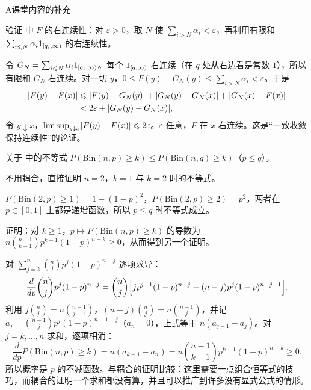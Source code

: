 \begin{exercises}{A}{课堂内容的补充}
\item\label{ex:distributions:A9} 验证 中 $F$ 的右连续性：对 $\varepsilon>0$，取 $N$ 使 $\sum_{i>N}\alpha_i<\varepsilon$，再利用有限和 $\sum_{i\leqslant N}\alpha_i1_{[q_i,\infty)}$ 的右连续性。
\begin{solution}
令 $G_N=\sum_{i\leqslant N}\alpha_i1_{[q_i,\infty)}$。每个 $1_{[q,\infty)}$ 右连续（在 $q$ 处从右边看是常数 $1$），所以有限和 $G_N$ 右连续。对一切 $y$，$0\leqslant F(y)-G_N(y)\leqslant\sum_{i>N}\alpha_i<\varepsilon$。于是
\[
\begin{aligned}
\lvert F(y)-F(x)\rvert&\leqslant\lvert F(y)-G_N(y)\rvert+\lvert G_N(y)-G_N(x)\rvert+\lvert G_N(x)-F(x)\rvert\\
&<2\varepsilon+\lvert G_N(y)-G_N(x)\rvert,
\end{aligned}
\]
令 $y\downarrow x$，$\limsup_{y\downarrow x}\lvert F(y)-F(x)\rvert\leqslant2\varepsilon$。$\varepsilon$ 任意，$F$ 在 $x$ 右连续。这是“一致收敛保持连续性”的论证。
\end{solution}

\item\label{ex:distributions:A10} 关于 中的不等式 $P(\mathrm{Bin}(n,p)\geqslant k)\leqslant P(\mathrm{Bin}(n,q)\geqslant k)$（$p\leqslant q$）。
\begin{questions}
\item 不用耦合，直接证明 $n=2$，$k=1$ 与 $k=2$ 时的不等式。
\begin{solution}
$P(\mathrm{Bin}(2,p)\geqslant1)=1-(1-p)^2$，$P(\mathrm{Bin}(2,p)\geqslant2)=p^2$，两者在 $p\in[0,1]$ 上都是递增函数，所以 $p\leqslant q$ 时不等式成立。
\end{solution}
\item 证明：对 $k\geqslant1$，$p\mapsto P(\mathrm{Bin}(n,p)\geqslant k)$ 的导数为 $n\binom{n-1}{k-1}p^{k-1}(1-p)^{n-k}\geqslant0$，从而得到另一个证明。
\begin{solution}
对 $\sum_{j=k}^n\binom njp^j(1-p)^{n-j}$ 逐项求导：
\[
\frac{d}{dp}\binom njp^j(1-p)^{n-j}=\binom nj\Bigl[jp^{j-1}(1-p)^{n-j}-(n-j)p^j(1-p)^{n-j-1}\Bigr].
\]
利用 $j\binom nj=n\binom{n-1}{j-1}$，$(n-j)\binom nj=n\binom{n-1}j$，并记 $a_j=\binom{n-1}jp^j(1-p)^{n-1-j}$（$a_n=0$），上式等于 $n(a_{j-1}-a_j)$。对 $j=k,\dots,n$ 求和，逐项相消：
\[
\frac{d}{dp}P(\mathrm{Bin}(n,p)\geqslant k)=n(a_{k-1}-a_n)=n\binom{n-1}{k-1}p^{k-1}(1-p)^{n-k}\geqslant0 .
\]
所以概率是 $p$ 的不减函数。与耦合的证明比较：这里需要一点组合恒等式的技巧，而耦合的证明一个求和都没有算，并且可以推广到许多没有显式公式的情形。
\end{solution}
\end{questions}
\end{exercises}

